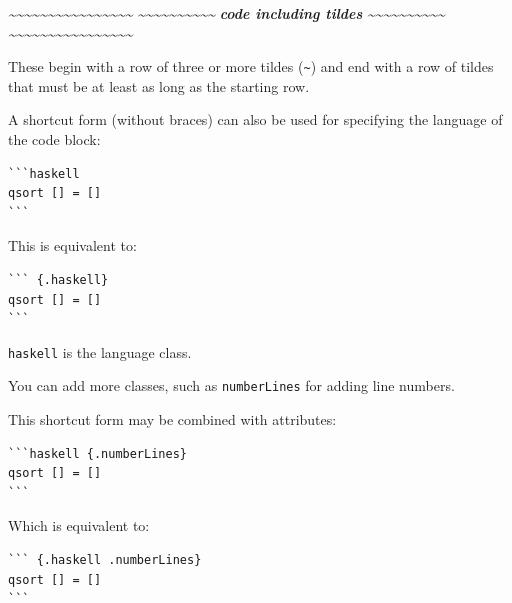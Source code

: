 \documentclass[
]{book}
\newenvironment{Shaded}{\begin{snugshade}}{\end{snugshade}}
\newcommand{\InformationTok}[1]{\textcolor[rgb]{0.56,0.35,0.01}{\textbf{\textit{#1}}}}
\begin{document}
\begin{Shaded}
\begin{Highlighting}[]
\InformationTok{\textasciitilde{}\textasciitilde{}\textasciitilde{}\textasciitilde{}\textasciitilde{}\textasciitilde{}\textasciitilde{}\textasciitilde{}\textasciitilde{}\textasciitilde{}\textasciitilde{}\textasciitilde{}\textasciitilde{}\textasciitilde{}\textasciitilde{}\textasciitilde{}}
\InformationTok{\textasciitilde{}\textasciitilde{}\textasciitilde{}\textasciitilde{}\textasciitilde{}\textasciitilde{}\textasciitilde{}\textasciitilde{}\textasciitilde{}\textasciitilde{}}
\InformationTok{code including tildes}
\InformationTok{\textasciitilde{}\textasciitilde{}\textasciitilde{}\textasciitilde{}\textasciitilde{}\textasciitilde{}\textasciitilde{}\textasciitilde{}\textasciitilde{}\textasciitilde{}}
\InformationTok{\textasciitilde{}\textasciitilde{}\textasciitilde{}\textasciitilde{}\textasciitilde{}\textasciitilde{}\textasciitilde{}\textasciitilde{}\textasciitilde{}\textasciitilde{}\textasciitilde{}\textasciitilde{}\textasciitilde{}\textasciitilde{}\textasciitilde{}\textasciitilde{}}
\end{Highlighting}
\end{Shaded}

These begin with a row of three or more tildes (\texttt{\textasciitilde{}}) and end with a row of tildes that must be at least as long as the starting row.

A shortcut form (without braces) can also be used for specifying the language of the code block:

\begin{verbatim}
```haskell
qsort [] = []
```
\end{verbatim}

This is equivalent to:

\begin{verbatim}
``` {.haskell}
qsort [] = []
```
\end{verbatim}

\texttt{haskell} is the language class.

You can add more classes, such as \texttt{numberLines} for adding line numbers.

This shortcut form may be combined with attributes:

\begin{verbatim}
```haskell {.numberLines}
qsort [] = []
```
\end{verbatim}

Which is equivalent to:

\begin{verbatim}
``` {.haskell .numberLines}
qsort [] = []
```
\end{verbatim}
\end{document}
